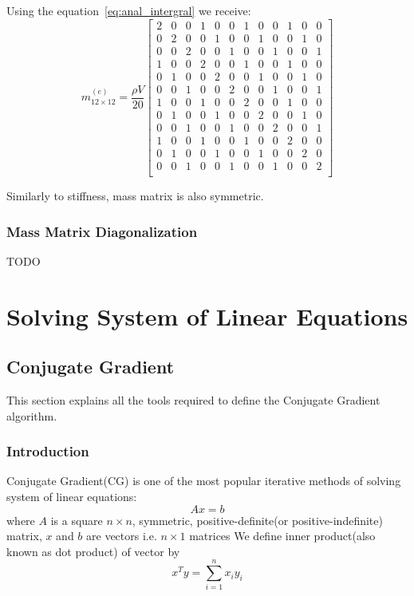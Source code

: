 \documentclass[en]{minipw} %
\begin{document}
Using the equation~\ref{eq:anal_intergral} we receive:
\begin{equation}
m^{(e)}_{12 \times 12} = \dfrac{\rho V}{20}
\begin{bmatrix}
2 & 0 & 0 & 1 & 0 & 0 & 1 & 0 & 0 & 1 & 0 & 0 \\
0 & 2 & 0 & 0 & 1 & 0 & 0 & 1 & 0 & 0 & 1 & 0 \\
0 & 0 & 2 & 0 & 0 & 1 & 0 & 0 & 1 & 0 & 0 & 1 \\
1 & 0 & 0 & 2 & 0 & 0 & 1 & 0 & 0 & 1 & 0 & 0 \\
0 & 1 & 0 & 0 & 2 & 0 & 0 & 1 & 0 & 0 & 1 & 0 \\
0 & 0 & 1 & 0 & 0 & 2 & 0 & 0 & 1 & 0 & 0 & 1 \\
1 & 0 & 0 & 1 & 0 & 0 & 2 & 0 & 0 & 1 & 0 & 0 \\
0 & 1 & 0 & 0 & 1 & 0 & 0 & 2 & 0 & 0 & 1 & 0 \\
0 & 0 & 1 & 0 & 0 & 1 & 0 & 0 & 2 & 0 & 0 & 1 \\
1 & 0 & 0 & 1 & 0 & 0 & 1 & 0 & 0 & 2 & 0 & 0 \\
0 & 1 & 0 & 0 & 1 & 0 & 0 & 1 & 0 & 0 & 2 & 0 \\
0 & 0 & 1 & 0 & 0 & 1 & 0 & 0 & 1 & 0 & 0 & 2 \\
\end{bmatrix}
\end{equation}

Similarly to stiffness, mass matrix is also symmetric.

\subsection{Mass Matrix Diagonalization}
TODO

\chapter{Solving System of Linear Equations}
\label{chap:system_linear}

\section{Conjugate Gradient}
This section explains all the tools required to define the Conjugate Gradient algorithm.
\subsection{Introduction}
Conjugate Gradient(CG) is one of the most popular iterative methods of solving system of linear equations:
\begin{equation}
Ax=b
\end{equation}
where $A$ is a square $n \times n$, symmetric, positive-definite(or positive-indefinite) matrix, $x$ and $b$ are vectors i.e. $n \times 1$ matrices
We define inner product(also known as dot product) of vector by 
\begin{equation}
x^{T}y = \sum^{n}_{i=1} x_i y_i
\end{equation}
\end{document}
